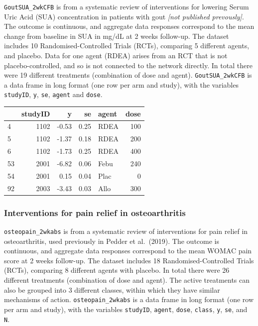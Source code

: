 \documentclass[]{article}
\begin{document}
\texttt{GoutSUA\_2wkCFB} is from a systematic review of interventions
for lowering Serum Uric Acid (SUA) concentration in patients with gout
\emph{{[}not published prevously{]}}. The outcome is continuous, and
aggregate data responses correspond to the mean change from baseline in
SUA in mg/dL at 2 weeks follow-up. The dataset includes 10
Randomised-Controlled Trials (RCTs), comparing 5 different agents, and
placebo. Data for one agent (RDEA) arises from an RCT that is not
placebo-controlled, and so is not connected to the network directly. In
total there were 19 different treatments (combination of dose and
agent). \texttt{GoutSUA\_2wkCFB} is a data frame in long format (one row
per arm and study), with the variables \texttt{studyID}, \texttt{y},
\texttt{se}, \texttt{agent} and \texttt{dose}.

\begin{longtable}[]{@{}lrrrlr@{}}
\toprule
& studyID & y & se & agent & dose\tabularnewline
\midrule
\endhead
4 & 1102 & -0.53 & 0.25 & RDEA & 100\tabularnewline
5 & 1102 & -1.37 & 0.18 & RDEA & 200\tabularnewline
6 & 1102 & -1.73 & 0.25 & RDEA & 400\tabularnewline
53 & 2001 & -6.82 & 0.06 & Febu & 240\tabularnewline
54 & 2001 & 0.15 & 0.04 & Plac & 0\tabularnewline
92 & 2003 & -3.43 & 0.03 & Allo & 300\tabularnewline
\bottomrule
\end{longtable}

\hypertarget{interventions-for-pain-relief-in-osteoarthritis}{%
\subsubsection{Interventions for pain relief in
osteoarthritis}\label{interventions-for-pain-relief-in-osteoarthritis}}

\texttt{osteopain\_2wkabs} is from a systematic review of interventions
for pain relief in osteoarthritis, used previously in Pedder et
al.~(2019). The outcome is continuous, and aggregate data responses
correspond to the mean WOMAC pain score at 2 weeks follow-up. The
dataset includes 18 Randomised-Controlled Trials (RCTs), comparing 8
different agents with placebo. In total there were 26 different
treatments (combination of dose and agent). The active treatments can
also be grouped into 3 different classes, within which they have similar
mechanisms of action. \texttt{osteopain\_2wkabs} is a data frame in long
format (one row per arm and study), with the variables \texttt{studyID},
\texttt{agent}, \texttt{dose}, \texttt{class}, \texttt{y}, \texttt{se},
and \texttt{N}.
\end{document}
